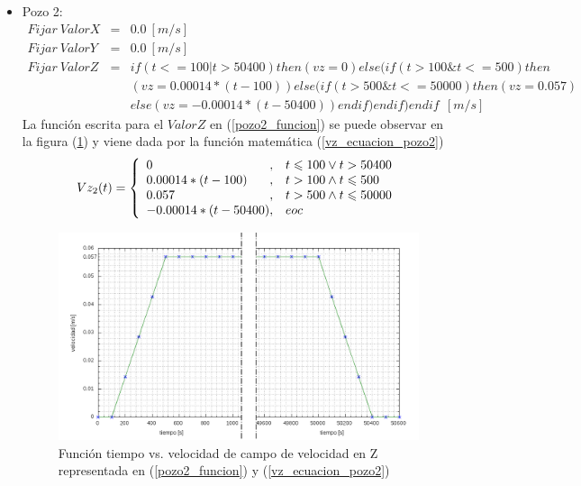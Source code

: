 \documentclass[10pt,a4paper,final]{article}
\begin{document}
\begin{itemize}
\item Pozo 2:
\begin{eqnarray} \label{pozo2_funcion}
\nonumber
Fijar~ValorX&=&0.0~[m/s]\\
\nonumber
Fijar~ValorY&=&0.0~[m/s]\\
Fijar~ValorZ&=& if(t<=100 | t>50400) then(vz=0)else(if(t>100 \& t<=500)then\\
\nonumber
&&(vz=0.00014*(t-100))else(if(t>500 \& t<=50000)then(vz=0.057)\\&&
\nonumber
else(vz=-0.00014*(t-50400))endif)endif)endif~~[m/s]
\end{eqnarray}
La función escrita para el $ValorZ$ en (\ref{pozo2_funcion}) se puede observar en la figura (\ref{grafica1_0057})  y viene dada por la función matemática (\ref{vz_ecuacion_pozo2})
%
\begin{equation}\label{vz_ecuacion_pozo2}
Vz_2(t) = \left\{
\begin{array}{l@{,\quad}l}
0 & t \leqslant 100\vee t > 50400 \\
0.00014*(t-100) & t > 100 \wedge t \leqslant 500 \\
0.057 & t > 500 \wedge t \leqslant 50000 \\
-0.00014*(t-50400) & eoc
\end{array}
\right.
\end{equation}
%

\begin{figure}[tbhp]
\centerline{\includegraphics[scale=0.3]{graficas/0057}}
\caption{Función tiempo vs. velocidad de campo de velocidad en Z representada en (\ref{pozo2_funcion}) y (\ref{vz_ecuacion_pozo2})}
\label{grafica1_0057}
\end{figure}

\end{itemize}
\end{document}

